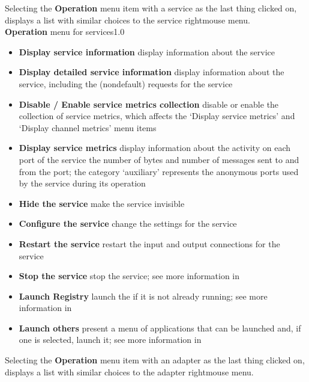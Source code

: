 \condPage{}
Selecting the \textbf{Operation} menu item with a service as the last thing clicked on,
displays a list with similar choices to the service right\longDash{}mouse menu.\\
%
{\textbf{Operation} menu for services}{1.0}
\begin{itemize}
\item\textbf{Display service information} display information about the service
\item\exSp\textbf{Display detailed service information} display information about the
service, including the (non\longDash{}default) requests for the service
\item\exSp\textbf{Disable / Enable service metrics collection} disable or enable the
collection of service metrics, which affects the `Display service metrics' and `Display
channel metrics' menu items
\item\exSp\textbf{Display service metrics} display information about the activity on each
port of the service \longDash{} the number of bytes and number of messages sent to and
from the port; the category `auxiliary' represents the anonymous ports used by the service
during its operation
\item\exSp\textbf{Hide the service} make the service invisible
\item\exSp\textbf{Configure the service} change the settings for the service
\item\exSp\textbf{Restart the service} restart the input and output connections for the
service
\item\exSp\textbf{Stop the service} stop the service; see more information in
\item\exSp\textbf{Launch Registry} launch the \emph{\RS} if it is not already running; see
more information in\\
\item\exSp\textbf{Launch others \textellipsis} present a menu of applications that can be
launched and, if one is selected, launch it; see more information in
\end{itemize}
\condPage{}
Selecting the \textbf{Operation} menu item with an adapter as the last thing clicked on,
displays a list with similar choices to the adapter right\longDash{}mouse menu.\\
